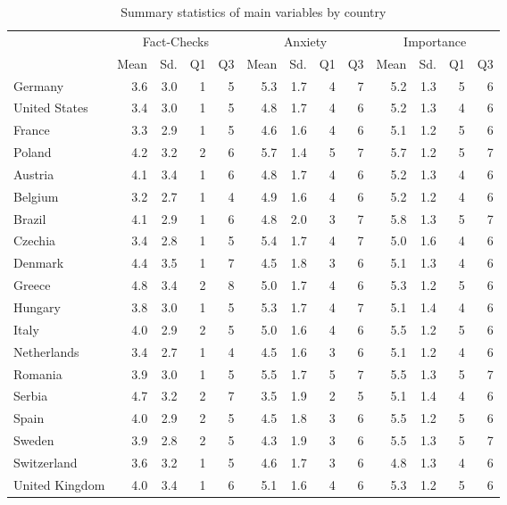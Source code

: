 \begin{table}[ht]
\centering
\begin{tabular}{lrrrrrrrrrrrr}
  \hline
  & \multicolumn{4}{c}{Fact-Checks}& \multicolumn{4}{c}{Anxiety}& \multicolumn{4}{c}{Importance}\\ & Mean & Sd. & Q1 & Q3 & Mean & Sd. & Q1 & Q3 & Mean & Sd. & Q1 & Q3 \\ \hline
Germany & 3.6 & 3.0 & 1 & 5 & 5.3 & 1.7 & 4 & 7 & 5.2 & 1.3 & 5 & 6 \\ 
  United States & 3.4 & 3.0 & 1 & 5 & 4.8 & 1.7 & 4 & 6 & 5.2 & 1.3 & 4 & 6 \\ 
  France & 3.3 & 2.9 & 1 & 5 & 4.6 & 1.6 & 4 & 6 & 5.1 & 1.2 & 5 & 6 \\ 
  Poland & 4.2 & 3.2 & 2 & 6 & 5.7 & 1.4 & 5 & 7 & 5.7 & 1.2 & 5 & 7 \\ 
  Austria & 4.1 & 3.4 & 1 & 6 & 4.8 & 1.7 & 4 & 6 & 5.2 & 1.3 & 4 & 6 \\ 
  Belgium & 3.2 & 2.7 & 1 & 4 & 4.9 & 1.6 & 4 & 6 & 5.2 & 1.2 & 4 & 6 \\ 
  Brazil & 4.1 & 2.9 & 1 & 6 & 4.8 & 2.0 & 3 & 7 & 5.8 & 1.3 & 5 & 7 \\ 
  Czechia & 3.4 & 2.8 & 1 & 5 & 5.4 & 1.7 & 4 & 7 & 5.0 & 1.6 & 4 & 6 \\ 
  Denmark & 4.4 & 3.5 & 1 & 7 & 4.5 & 1.8 & 3 & 6 & 5.1 & 1.3 & 4 & 6 \\ 
  Greece & 4.8 & 3.4 & 2 & 8 & 5.0 & 1.7 & 4 & 6 & 5.3 & 1.2 & 5 & 6 \\ 
  Hungary & 3.8 & 3.0 & 1 & 5 & 5.3 & 1.7 & 4 & 7 & 5.1 & 1.4 & 4 & 6 \\ 
  Italy & 4.0 & 2.9 & 2 & 5 & 5.0 & 1.6 & 4 & 6 & 5.5 & 1.2 & 5 & 6 \\ 
  Netherlands & 3.4 & 2.7 & 1 & 4 & 4.5 & 1.6 & 3 & 6 & 5.1 & 1.2 & 4 & 6 \\ 
  Romania & 3.9 & 3.0 & 1 & 5 & 5.5 & 1.7 & 5 & 7 & 5.5 & 1.3 & 5 & 7 \\ 
  Serbia & 4.7 & 3.2 & 2 & 7 & 3.5 & 1.9 & 2 & 5 & 5.1 & 1.4 & 4 & 6 \\ 
  Spain & 4.0 & 2.9 & 2 & 5 & 4.5 & 1.8 & 3 & 6 & 5.5 & 1.2 & 5 & 6 \\ 
  Sweden & 3.9 & 2.8 & 2 & 5 & 4.3 & 1.9 & 3 & 6 & 5.5 & 1.3 & 5 & 7 \\ 
  Switzerland & 3.6 & 3.2 & 1 & 5 & 4.6 & 1.7 & 3 & 6 & 4.8 & 1.3 & 4 & 6 \\ 
  United Kingdom & 4.0 & 3.4 & 1 & 6 & 5.1 & 1.6 & 4 & 6 & 5.3 & 1.2 & 5 & 6 \\ 
   \hline
\end{tabular}
\caption{Summary statistics of main variables by country} 
\label{sumstats::vars}
\end{table}
